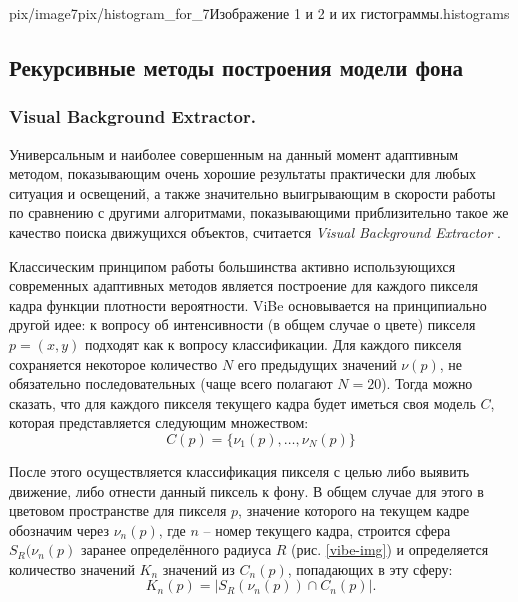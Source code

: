 {pix/image7}{pix/histogram_for_7}{Изображение 1 и 2
и их гистограммы.}{histograms}

\newpage


\subsection{Рекурсивные методы построения модели фона}

\subsubsection{Visual Background Extractor.}

Универсальным и наиболее совершенным на данный момент адаптивным методом,
показывающим очень хорошие результаты практически для любых ситуация и
освещений, а также значительно выигрывающим в скорости работы по сравнению с
другими алгоритмами, показывающими приблизительно такое же качество поиска
движущихся объектов, считается {\it Visual Background Extractor} 
\cite{van-vibe}.

Классическим принципом работы большинства активно использующихся современных 
адаптивных методов является построение для каждого пикселя кадра функции
плотности вероятности. ViBe основывается на принципиально другой идее:
к вопросу об интенсивности (в общем случае о цвете) пикселя $p=(x,y)$ 
подходят как к вопросу классификации. Для каждого пикселя сохраняется 
некоторое количество $N$ его предыдущих значений $\nu(p)$, не обязательно
последовательных (чаще всего полагают $N=20$). Тогда можно сказать, что для
каждого пикселя текущего кадра будет иметься своя модель $C$, которая
представляется следующим множеством:
\begin{equation}
 C(p)=\{ \nu_1(p), \ldots, \nu_N(p) \}
 \label{vibe-equat1}
\end{equation}

После этого осуществляется классификация пикселя с целью либо выявить движение,
либо отнести данный пиксель к фону. В общем случае для этого в цветовом 
пространстве для пикселя $p$, значение которого на текущем кадре обозначим
через $\nu_n(p)$, где $n$ -- номер текущего кадра, строится сфера
$S_R(\nu_n(p)$ заранее определённого радиуса $R$ (рис. \ref{vibe-img}) и
определяется количество значений $K_n$ значений из $C_n(p)$, попадающих
в эту сферу:
\begin{equation}
	K_n(p)= |S_R(\nu_n(p)) \cap C_n(p)|.
	\label{vibe-equat2}
\end{equation}

